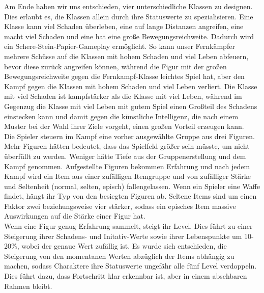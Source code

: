 \documentclass[extern,palatino]{cgBA}
\begin{document}
Am Ende haben wir uns entschieden, vier unterschiedliche Klassen zu designen. Dies erlaubt es, die Klassen allein durch ihre Statuswerte zu spezialisieren. Eine Klasse kann viel Schaden überleben, eine auf lange Distanzen angreifen, eine macht viel Schaden und eine hat eine große Bewegungsreichweite. Dadurch wird ein Schere-Stein-Papier-Gameplay ermöglicht. So kann unser Fernkämpfer mehrere Schüsse auf die Klassen mit hohem Schaden und viel Leben abfeuern, bevor diese zurück angreifen können, während die Figur mit der großen Bewegungsreichweite gegen die Fernkampf-Klasse leichtes Spiel hat, aber den Kampf gegen die Klassen mit hohem Schaden und viel Leben verliert. Die Klasse mit viel Schaden ist kampfstärker als die Klasse mit viel Leben, während im Gegenzug die Klasse mit viel Leben mit gutem Spiel einen Großteil des Schadens einstecken kann und damit gegen die künstliche Intelligenz, die nach einem Muster bei der Wahl ihrer Ziele vorgeht, einen großen Vorteil erzeugen kann.
\\Die Spieler steuern im Kampf eine vorher ausgewählte Gruppe aus drei Figuren. Mehr Figuren hätten bedeutet, dass das Spielfeld größer sein müsste, um nicht überfüllt zu werden. Weniger hätte Tiefe aus der Gruppenerstellung und dem Kampf genommen. Aufgestellte Figuren bekommen Erfahrung und nach jedem Kampf wird ein Item aus einer zufälligen Itemgruppe und von zufälliger Stärke und Seltenheit (normal, selten, episch) fallengelassen. Wenn ein Spieler eine Waffe findet, hängt ihr Typ von den besiegten Figuren ab. Seltene Items sind um einen Faktor zwei beziehungsweise vier stärker, sodass ein episches Item massive Auswirkungen auf die Stärke einer Figur hat.
\\Wenn eine Figur genug Erfahrung sammelt, steigt ihr Level. Dies führt zu einer Steigerung ihrer Schadens- und Initativ-Werte sowie ihrer Lebenspunkte um 10-20\%, wobei der genaue Wert zufällig ist. Es wurde sich entschieden, die Steigerung von den momentanen Werten abzüglich der Items abhängig zu machen, sodass Charaktere ihre Statuswerte ungefähr alle fünf Level verdoppeln. Dies führt dazu, dass Fortschritt klar erkennbar ist, aber in einem absehbaren Rahmen bleibt.
\end{document}
